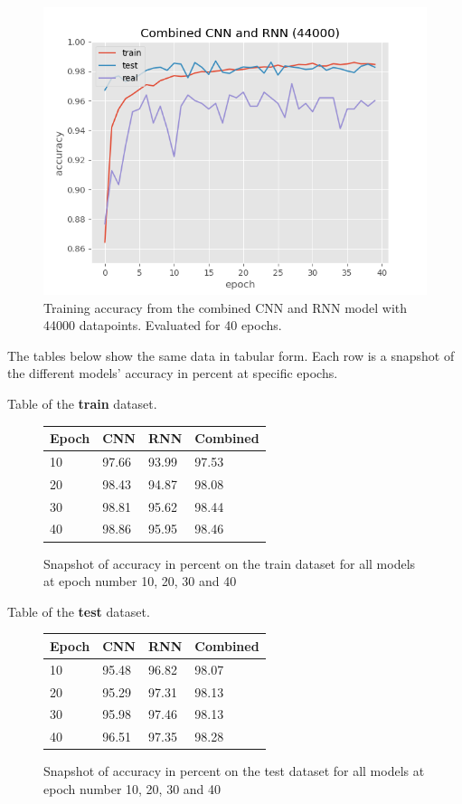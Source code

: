 \begin{figure}[H]
    \centering
    \includegraphics[width=.8\linewidth]{Assets/Chapter4_Result/Combined_CNN_and_RNN_40_epoch.png}
    \caption{Training accuracy from the combined CNN and RNN model with 44000 datapoints. Evaluated for 40 epochs.}
    \label{fig:combined_CNN_RNN_44000}
\end{figure}

The tables below show the same data in tabular form. Each row is a snapshot of the different models' accuracy in percent at specific epochs. 

Table of the \textbf{train} dataset.
\begin{figure}[H]
    \centering
        \begin{tabular}{| p{2cm} | p{3cm} | p{3cm} | p{3cm} |}
    \hline
    Epoch & \textbf{CNN} & \textbf{RNN} & \textbf{Combined} \\ \hline
    10 & 97.66 & 93.99 & 97.53 \\ \hline
    20 & 98.43 & 94.87 & 98.08 \\ \hline
    30 & 98.81 & 95.62 & 98.44 \\ \hline
    40 & 98.86 & 95.95 & 98.46 \\ \hline
    \end{tabular}
    \caption{Snapshot of accuracy in percent on the train dataset for all models at epoch number 10, 20, 30 and 40}

    \label{fig:table_train_dataset}
\end{figure}

Table of the \textbf{test} dataset.
\begin{figure}[H]
    \centering
    \begin{tabular}{| p{2cm} | p{3cm} | p{3cm} | p{3cm} |}
    \hline
    Epoch & \textbf{CNN} & \textbf{RNN} & \textbf{Combined} \\ \hline
    10 & 95.48 & 96.82 & 98.07 \\ \hline
    20 & 95.29 & 97.31 & 98.13 \\ \hline
    30 & 95.98 & 97.46 & 98.13 \\ \hline
    40 & 96.51 & 97.35 & 98.28 \\ \hline
    \end{tabular}
    \caption{Snapshot of accuracy in percent on the test dataset for all models at epoch number 10, 20, 30 and 40}
    \label{fig:table_test_dataset}

\end{figure}

